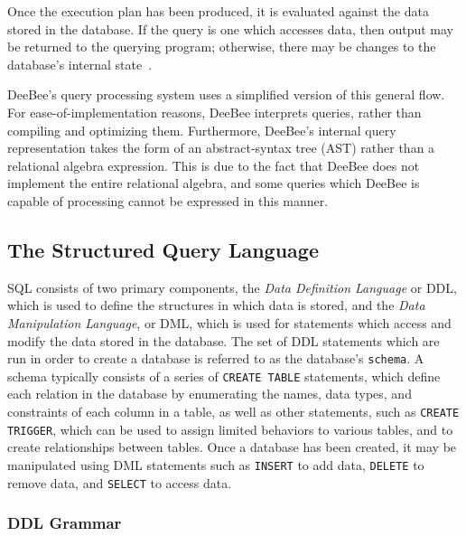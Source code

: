 Once the execution plan has been produced, it is evaluated against the data stored in the database. If the query is one which accesses data, then output may be returned to the querying program; otherwise, there may be changes to the database's internal state~\cite{silberschatz2010database,harrington2009relational,garcia2000database}.

DeeBee's query processing system uses a simplified version of this general flow. For ease-of-implementation reasons, DeeBee interprets queries, rather than compiling and optimizing them. Furthermore, DeeBee's internal query representation takes the form of an abstract-syntax tree (AST) rather than a relational algebra expression. This is due to the fact that DeeBee does not implement the entire relational algebra, and some queries which DeeBee is capable of processing cannot be expressed in this manner.

\subsection{The Structured Query Language}
SQL consists of two primary components, the \textit{Data Definition Language} or DDL, which is used to define the structures in which data is stored, and the \textit{Data Manipulation Language}, or DML, which is used for statements which access and modify the data stored in the database. The set of DDL statements which are run in order to create a database is referred to as the database's \texttt{schema}. A schema typically consists of a series of \texttt{CREATE TABLE} statements, which define each relation in the database by enumerating the names, data types, and constraints of each column in a table, as well as other statements, such as \texttt{CREATE TRIGGER}, which can be used to assign limited behaviors to various tables, and to create relationships between tables. Once a database has been created, it may be manipulated using DML statements such as \texttt{INSERT} to add data, \texttt{DELETE} to remove data, and \texttt{SELECT} to access data.

\subsubsection{DDL Grammar}

